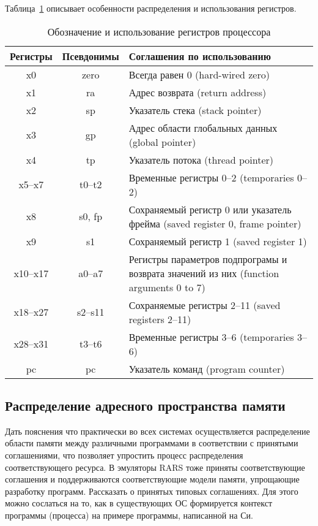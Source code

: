 
Таблица~\ref{table-registers} описывает особенности распределения и использования регистров.

\begin{table}[h]
    \caption{Обозначение и использование регистров процессора}
    \centering
    \begin{tabularx}{\textwidth}{|c|c|X|}
        \hline
        \textbf{Регистры} & \textbf{Псевдонимы} & \textbf{Соглашения по использованию} \\
        \hline %
        x0 & zero & Всегда равен 0 (hard-wired zero) \\
        \hline
        x1 & ra & Адрес возврата (return address) \\
        \hline
        x2 & sp & Указатель стека (stack pointer) \\
        \hline
        x3 & gp & Адрес области глобальных данных (global pointer) \\
        \hline
        x4 & tp &  Указатель потока (thread pointer) \\
        \hline
        x5--x7 & t0--t2 & Временные регистры 0--2 (temporaries 0--2) \\
        \hline
        x8 & s0, fp & Сохраняемый регистр 0 или указатель фрейма (saved register 0, frame pointer) \\
        \hline
        x9 & s1 & Сохраняемый регистр 1 (saved register 1) \\
        \hline
        x10--x17 & a0--a7 & Регистры параметров подпрограмы и возврата значений из них (function arguments 0 to 7) \\
        \hline
        x18--x27 & s2--s11 & Сохраняемые регистры 2--11 (saved registers 2--11) \\
        \hline
        x28--x31 & t3--t6 & Временные регистры 3--6 (temporaries 3--6) \\
        \hline
        pc & pc & Указатель команд (program counter) \\
        \hline
    \end{tabularx}
    \label{table-registers}
\end{table}

\subsection{Распределение адресного пространства памяти}
Дать пояснения что практически во всех системах осуществляется распределение области памяти между различными программами в соответствии с принятыми соглашениями, что позволяет упростить процесс распределения соответствующего ресурса. В эмуляторы RARS тоже приняты соответствующие соглашения и поддерживаются соответствующие модели памяти, упрощающие разработку программ. Рассказать о принятых типовых соглашениях. Для этого можно сослаться на то, как в существующих ОС формируется контекст программы (процесса) на примере программы, написанной на Си.

